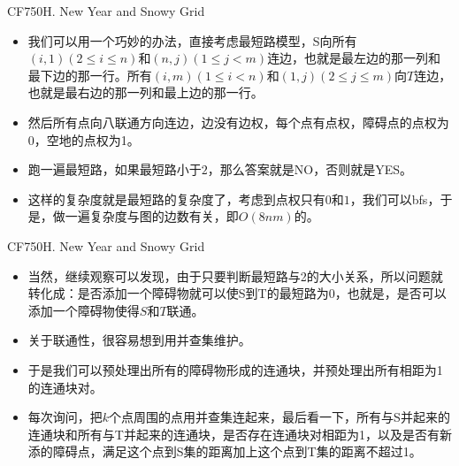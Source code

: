\begin{frame}{CF750H. New Year and Snowy Grid}
    \begin{itemize}
        \item 我们可以用一个巧妙的办法，直接考虑最短路模型，S向所有$(i,1)(2 \le i \le n)$和$(n,j)(1 \le j<m)$连边，也就是最左边的那一列和最下边的那一行。所有$(i,m)(1 \le i<n)$和$(1,j)(2 \le j \le m)$向$T$连边，也就是最右边的那一列和最上边的那一行。
        \item 然后所有点向八联通方向连边，边没有边权，每个点有点权，障碍点的点权为0，空地的点权为1。
        \item 跑一遍最短路，如果最短路小于$2$，那么答案就是NO，否则就是YES。
        \item 这样的复杂度就是最短路的复杂度了，考虑到点权只有$0$和$1$，我们可以bfs，于是，做一遍复杂度与图的边数有关，即$O(8nm)$的。
    \end{itemize}
\end{frame}

\begin{frame}{CF750H. New Year and Snowy Grid}
    \begin{itemize}
        \item 当然，继续观察可以发现，由于只要判断最短路与2的大小关系，所以问题就转化成：是否添加一个障碍物就可以使S到T的最短路为0，也就是，是否可以添加一个障碍物使得$S$和$T$联通。
        \item 关于联通性，很容易想到用并查集维护。
        \item 于是我们可以预处理出所有的障碍物形成的连通块，并预处理出所有相距为1的连通块对。
        \item 每次询问，把$k$个点周围的点用并查集连起来，最后看一下，所有与S并起来的连通块和所有与T并起来的连通块，是否存在连通块对相距为1，以及是否有新添的障碍点，满足这个点到S集的距离加上这个点到T集的距离不超过1。
    \end{itemize}
\end{frame}

